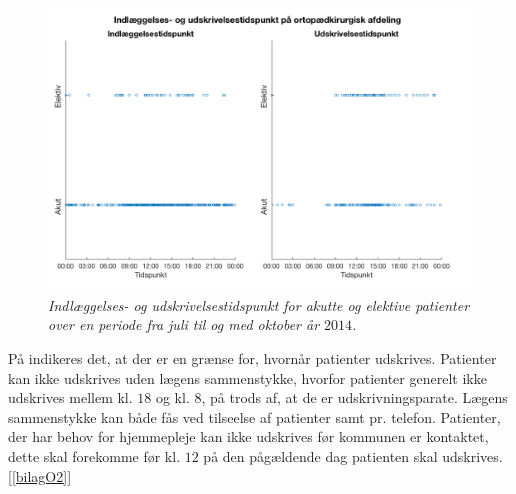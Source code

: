 \begin{figure}[H]
	\centering
	\includegraphics[scale=0.35]{figures/indlaegudskriv.png}
	\caption{\textit{Indlæggelses- og udskrivelsestidspunkt for akutte og elektive patienter over en periode fra juli til og med oktober år $2014$.}\cite{REOS}}
	\label{indlaegudskriv}
	\end{figure}
	
\noindent
På  indikeres det, at der er en grænse for, hvornår patienter udskrives. Patienter kan ikke udskrives uden lægens sammenstykke, hvorfor patienter generelt ikke udskrives mellem kl. $18$ og kl. $8$, på trods af, at de er udskrivningsparate. Lægens sammenstykke kan både fås ved tilseelse af patienter samt pr. telefon. Patienter, der har behov for hjemmepleje kan ikke udskrives før kommunen er kontaktet, dette skal forekomme før kl. $12$ på den pågældende dag patienten skal udskrives.[\ref{bilagO2}]

